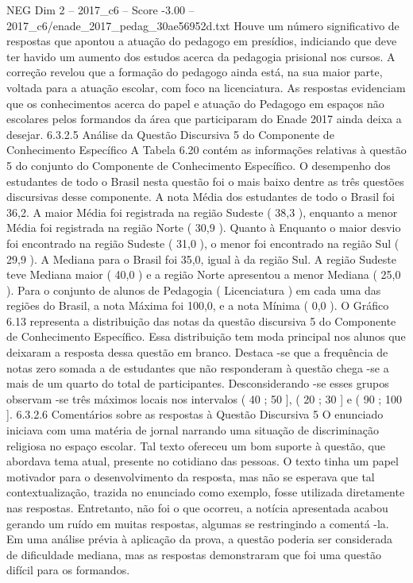 \begin{textsample}{NEG Dim 2 – 2017\_c6 – Score -3.00 – 2017\_c6/enade\_2017\_pedag\_30ae56952d.txt}
Houve um número significativo de respostas que apontou a atuação do pedagogo em presídios, indiciando que deve ter havido um aumento dos estudos acerca da pedagogia prisional nos cursos.
A correção revelou que a formação do pedagogo ainda está, na sua maior parte, voltada para a atuação escolar, com foco na licenciatura.
As respostas evidenciam que os conhecimentos acerca do papel e atuação do Pedagogo em espaços não escolares pelos formandos da área que participaram do Enade 2017 ainda deixa a desejar. 6.3.2.5 Análise da Questão Discursiva 5 do Componente de Conhecimento Específico A Tabela 6.20 contém as informações relativas à questão 5 do conjunto do Componente de Conhecimento Específico.
O desempenho dos estudantes de todo o Brasil nesta questão foi o mais baixo dentre as três questões discursivas desse componente.
A nota Média dos estudantes de todo o Brasil foi 36,2.
A maior Média foi registrada na região Sudeste ( 38,3 ), enquanto a menor Média foi registrada na região Norte ( 30,9 ).
Quanto à Enquanto o maior desvio foi encontrado na região Sudeste ( 31,0 ), o menor foi encontrado na região Sul ( 29,9 ).
A Mediana para o Brasil foi 35,0, igual à da região Sul.
A região Sudeste teve Mediana maior ( 40,0 ) e a região Norte apresentou a menor Mediana ( 25,0 ).
Para o conjunto de alunos de Pedagogia ( Licenciatura ) em cada uma das regiões do Brasil, a nota Máxima foi 100,0, e a nota Mínima ( 0,0 ).
O Gráfico 6.13 representa a distribuição das notas da questão discursiva 5 do Componente de Conhecimento Específico.
Essa distribuição tem moda principal nos alunos que deixaram a resposta dessa questão em branco.
Destaca -se que a frequência de notas zero somada a de estudantes que não responderam à questão chega -se a mais de um quarto do total de participantes.
Desconsiderando -se esses grupos observam -se três máximos locais nos intervalos ( 40 ; 50 ], ( 20 ; 30 ] e ( 90 ; 100 ]. 6.3.2.6 Comentários sobre as respostas à Questão Discursiva 5 O enunciado iniciava com uma matéria de jornal narrando uma situação de discriminação religiosa no espaço escolar.
Tal texto ofereceu um bom suporte à questão, que abordava tema atual, presente no cotidiano das pessoas.
O texto tinha um papel motivador para o desenvolvimento da resposta, mas não se esperava que tal contextualização, trazida no enunciado como exemplo, fosse utilizada diretamente nas respostas.
Entretanto, não foi o que ocorreu, a notícia apresentada acabou gerando um ruído em muitas respostas, algumas se restringindo a comentá -la.
Em uma análise prévia à aplicação da prova, a questão poderia ser considerada de dificuldade mediana, mas as respostas demonstraram que foi uma questão difícil para os formandos.

\end{textsample}
